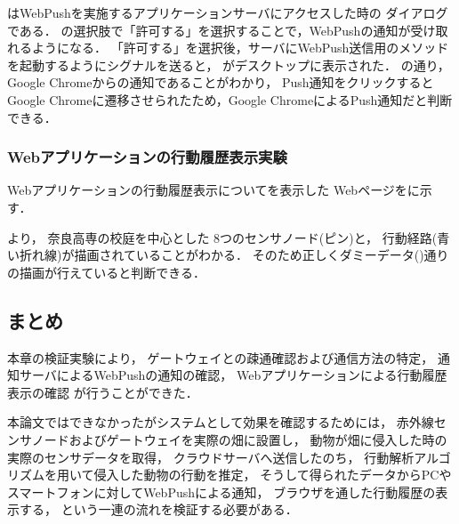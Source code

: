 \documentclass[12pt]{honka_v1}
\begin{document}
はWebPushを実施するアプリケーションサーバにアクセスした時の
ダイアログである．
の選択肢で「許可する」を選択することで，WebPushの通知が受け取れるようになる．
「許可する」を選択後，サーバにWebPush送信用のメソッドを起動するようにシグナルを送ると，
がデスクトップに表示された．
の通り，Google Chromeからの通知であることがわかり，
Push通知をクリックするとGoogle Chromeに遷移させられたため，Google ChromeによるPush通知だと判断できる．


\subsubsection{Webアプリケーションの行動履歴表示実験}
Webアプリケーションの行動履歴表示についてを表示した
Webページをに示す．


より，
奈良高専の校庭を中心とした
8つのセンサノード(ピン)と，
行動経路(青い折れ線)が描画されていることがわかる．
そのため正しくダミーデータ()通りの描画が行えていると判断できる．


\subsection{まとめ}
本章の検証実験により，
ゲートウェイとの疎通確認および通信方法の特定，
通知サーバによるWebPushの通知の確認，
Webアプリケーションによる行動履歴表示の確認
が行うことができた．

本論文ではできなかったがシステムとして効果を確認するためには，
赤外線センサノードおよびゲートウェイを実際の畑に設置し，
動物が畑に侵入した時の実際のセンサデータを取得，
クラウドサーバへ送信したのち，
行動解析アルゴリズムを用いて侵入した動物の行動を推定，
そうして得られたデータからPCやスマートフォンに対してWebPushによる通知，
ブラウザを通した行動履歴の表示する，
という一連の流れを検証する必要がある．



\end{document}
